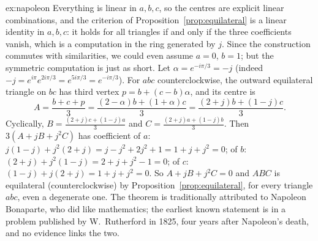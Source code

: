 \begin{solution}{ex:napoleon}
\idea Everything is linear in $a,b,c$, so the centres are explicit linear combinations, and the criterion of Proposition~\ref{prop:equilateral} is a linear identity in $a,b,c$: it holds for all triangles if and only if the three coefficients vanish, which is a computation in the ring generated by $j$. Since the construction commutes with similarities, we could even assume $a=0$, $b=1$; but the symmetric computation is just as short.
\writeup Let $\alpha=e^{-i\pi/3}=-j$ (indeed $-j=e^{i\pi}e^{2i\pi/3}=e^{5i\pi/3}=e^{-i\pi/3}$). For $abc$ counterclockwise, the outward equilateral triangle on $bc$ has third vertex $p=b+(c-b)\alpha$, and its centre is
\[
A=\frac{b+c+p}3=\frac{(2-\alpha)b+(1+\alpha)c}3=\frac{(2+j)b+(1-j)c}3.
\]
Cyclically, $B=\frac{(2+j)c+(1-j)a}3$ and $C=\frac{(2+j)a+(1-j)b}3$. Then $3(A+jB+j^2C)$ has coefficient of $a$: $j(1-j)+j^2(2+j)=j-j^2+2j^2+1=1+j+j^2=0$; of $b$: $(2+j)+j^2(1-j)=2+j+j^2-1=0$; of $c$: $(1-j)+j(2+j)=1+j+j^2=0$. So $A+jB+j^2C=0$ and $ABC$ is equilateral (counterclockwise) by Proposition~\ref{prop:equilateral}, for every triangle $abc$, even a degenerate one. The theorem is traditionally attributed to Napoleon Bonaparte, who did like mathematics; the earliest known statement is in a problem published by W.~Rutherford in 1825, four years after Napoleon's death, and no evidence links the two.
\end{solution}

